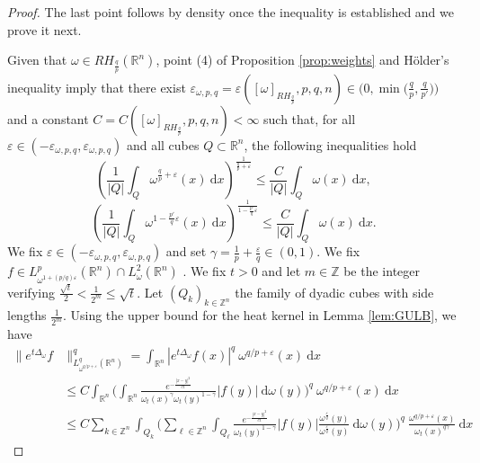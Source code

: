 \documentclass[10pt,a4paper]{amsart}
\begin{document}
\begin{proof} The last point follows by density once the inequality is established and we prove it next. 

    Given that $\omega \in RH_{\frac{q}{p}}(\mathbb{R}^n)$, point (4) of Proposition \ref{prop:weights} and Hölder's inequality imply that there exist {$\varepsilon_{\omega, p,q} = \varepsilon([\omega]_{RH_{\frac{q}{p}}},p,q,n) \in \big(0, \min\big(\frac q p, \frac{q}{p'}\big)\big)$} and a constant $C = C([\omega]_{RH_{\frac{q}{p}}},p,q,n) <\infty$ such that, for all $\varepsilon \in (-\varepsilon_{\omega, p,q}, \varepsilon_{\omega, p,q})$ and all cubes $Q \subset \mathbb{R}^n$, the following inequalities hold
    \begin{equation}\label{eq:theta}
        \left ( \frac{1}{|Q|} \int_Q \omega^{\frac{q}{p}+\varepsilon}(x) \ \mathrm{d}x   \right )^{\frac{1}{\frac{q}{p}+\varepsilon}} \leq \frac{C}{|Q|} \int_Q \omega(x) \ \mathrm{d}x,
    \end{equation} 
    \begin{equation}\label{eq:thetatilde}
        \left ( \frac{1}{|Q|} \int_Q \omega^{1-\frac{p'}{q}\varepsilon}(x) \ \mathrm{d}x   \right )^{\frac{1}{1-\frac{p'}{q}\varepsilon} }\leq  \frac{C}{|Q|} \int_Q \omega(x) \ \mathrm{d}x.
    \end{equation}
    We fix $\varepsilon \in (-\varepsilon_{\omega, p,q},\varepsilon_{\omega, p,q})$ and set $\gamma= \frac{1}{p}+\frac{\varepsilon}{q} \in (0,1)$. We fix $f\in L^p_{\omega^{1+(p/q)\varepsilon}}(\mathbb{R}^n) \cap L^2_\omega(\mathbb{R}^n)$ . We fix $t>0$ and let $m \in \mathbb{Z}$ be the integer verifying $\frac{\sqrt{t}}{2}<\frac{1}{2^m}\le \sqrt{t}$. Let $(Q_{k})_{k\in \mathbb{Z}^n}$ the family of dyadic cubes with side lengths $\frac{1}{2^m}$. Using the upper bound for the heat kernel in Lemma \ref{lem:GULB}, we have  
    \begin{align*}
        \| e^{t\Delta_\omega} f &\|^q_{L^q_{{\omega}^{q/p+\varepsilon}}(\mathbb{R}^n)}= \int_{\mathbb{R}^n} |e^{t\Delta_\omega} f(x)|^q\  \omega^{q/p+\varepsilon}(x) \ \mathrm{d}x 
        \\&\leq C \int_{\mathbb{R}^n} \bigg( \int_{\mathbb{R}^n} \frac{e^{-\frac{|x-y|^2}{ct}}}{\omega_t(x)^{\gamma}\omega_t(y)^{1-\gamma}}|f(y)| \ \mathrm{d} \omega(y) \bigg)^q\  \omega^{q/p+\varepsilon}(x) \ \mathrm{d}x 
        \\& \leq C \sum_{k\in \mathbb{Z}^n} \int_{Q_{k}} \bigg( \sum_{\ell \in \mathbb{Z}^n} \int_{Q_{\ell}} \frac{e^{-\frac{|x-y|^2}{ct}}}{\omega_t(y)^{1-\gamma}}|f(y)| \frac{\omega^{\frac{\varepsilon}{q}}(y)}{\omega^{\frac{\varepsilon}{q}}(y)} \ \mathrm{d} \omega(y) \bigg)^q\ \frac{\omega^{q/p+\varepsilon}(x)}{\omega_t(x)^{q\gamma}} \ \mathrm{d}x

\end{align*}
\end{proof}
\end{document}

